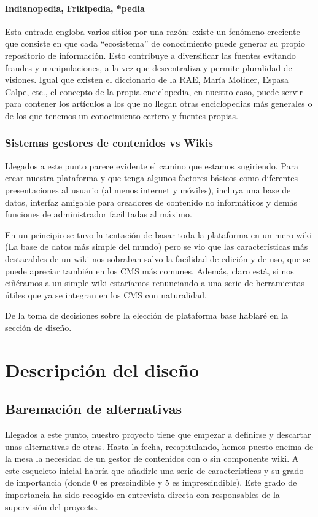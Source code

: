 \paragraph{Indianopedia, Frikipedia, *pedia}
\par Esta entrada engloba varios sitios por una razón: existe un fenómeno creciente que consiste en que cada ``ecosistema'' de conocimiento puede generar su propio repositorio de información. Esto contribuye a diversificar las fuentes evitando fraudes y manipulaciones, a la vez que descentraliza y permite pluralidad de visiones. Igual que existen el diccionario de la RAE, María Moliner, Espasa Calpe, etc., el concepto de la propia enciclopedia, en nuestro caso, puede servir para contener los artículos a los que no llegan otras enciclopedias más generales o de los que tenemos un conocimiento certero y fuentes propias.

\subsubsection{Sistemas gestores de contenidos vs Wikis}
\par Llegados a este punto parece evidente el camino que estamos sugiriendo. Para crear nuestra plataforma y que tenga algunos factores básicos como diferentes presentaciones al usuario (al menos internet y móviles), incluya una base de datos, interfaz amigable para creadores de contenido no informáticos y demás funciones de administrador facilitadas al máximo.

En un principio se tuvo la tentación de basar toda la plataforma en un mero wiki (La base de datos más simple del mundo) pero se vio que las características más destacables de un wiki nos sobraban salvo la facilidad de edición y de uso, que se puede apreciar también en los CMS más comunes. Además, claro está, si nos ciñéramos a un simple wiki estaríamos renunciando a una serie de herramientas útiles que ya se integran en los CMS con naturalidad.

De la toma de decisiones sobre la elección de plataforma base hablaré en la sección de diseño.


\section{Descripción del diseño}

\subsection{Baremación de alternativas}
\par Llegados a este punto, nuestro proyecto tiene que empezar a definirse y descartar unas alternativas de otras. Hasta la fecha, recapitulando, hemos puesto encima de la mesa la necesidad de un gestor de contenidos con o sin componente wiki. A este esqueleto inicial habría que añadirle una serie de características y su grado de importancia (donde 0 es prescindible y 5 es imprescindible). Este grado de importancia ha sido recogido en entrevista directa con responsables de la supervisión del proyecto.

